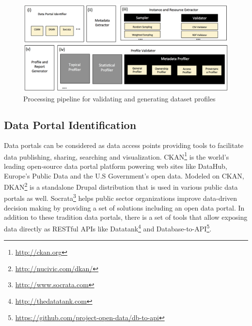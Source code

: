 \documentclass[runningheads,a4paper]{../../Util/LaTEX/llncs}
\begin{document}
\begin{figure}[!ht]
  \centering
  \includegraphics[scale=0.4]{figure-1_architecture.png}
  \caption{Processing pipeline for validating and generating dataset profiles}
  \label{fig:Roomba_architecture}
\end{figure}

\subsection{Data Portal Identification}
Data portals can be considered as data access points providing tools to facilitate data publishing, sharing, searching and visualization. CKAN\footnote{\url{http://ckan.org}} is the world's leading open-source data portal platform powering web sites like DataHub, Europe's Public Data and the U.S Government's open data. Modeled on CKAN, DKAN\footnote{\url{http://nucivic.com/dkan/}} is a standalone Drupal distribution that is used in various public data portals as well. Socrata\footnote{\url{http://www.socrata.com}} helps public sector organizations improve data-driven decision making by providing a set of solutions including an open data portal. In addition to these tradition data portals, there is a set of tools that allow exposing data directly as RESTful APIs like Datatank\footnote{\url{http://thedatatank.com}} and Database-to-API\footnote{\url{https://github.com/project-open-data/db-to-api}}.
\end{document}
